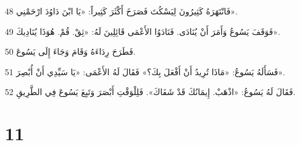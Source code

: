 \par 48 فَانْتَهَرَهُ كَثِيرُونَ لِيَسْكُتَ فَصَرَخَ أَكْثَرَ كَثِيراً: «يَا ابْنَ دَاوُدَ ارْحَمْنِي».
\par 49 فَوَقَفَ يَسُوعُ وَأَمَرَ أَنْ يُنَادَى. فَنَادَوُا الأَعْمَى قَائِلِينَ لَهُ: «ثِقْ. قُمْ. هُوَذَا يُنَادِيكَ».
\par 50 فَطَرَحَ رِدَاءَهُ وَقَامَ وَجَاءَ إِلَى يَسُوعَ.
\par 51 فَسَأَلَهُ يَسُوعُ: «مَاذَا تُرِيدُ أَنْ أَفْعَلَ بِكَ؟» فَقَالَ لَهُ الأَعْمَى: «يَا سَيِّدِي أَنْ أُبْصِرَ».
\par 52 فَقَالَ لَهُ يَسُوعُ: «اذْهَبْ. إِيمَانُكَ قَدْ شَفَاكَ». فَلِلْوَقْتِ أَبْصَرَ وَتَبِعَ يَسُوعَ فِي الطَّرِيقِ.

\chapter{11}

